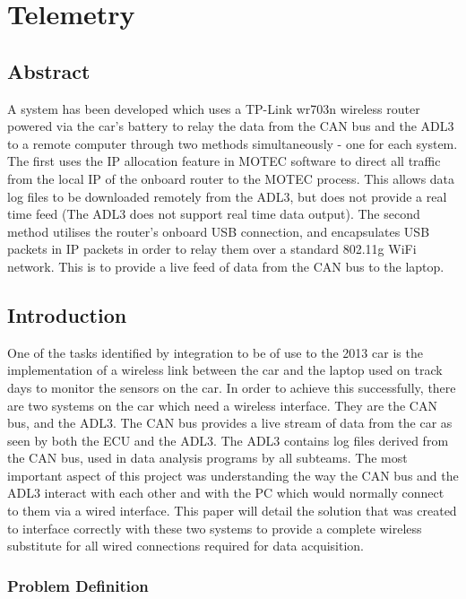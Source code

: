 

\chapter{Telemetry}
\section{Abstract}
A system has been developed which uses a TP-Link wr703n wireless router powered via the car's battery to relay the data from the CAN bus and the ADL3 to a remote computer through two methods simultaneously - one for each system. The first uses the IP allocation feature in MOTEC software to direct all traffic from the local IP of the onboard router to the MOTEC process. This allows data log files to be downloaded remotely from the ADL3, but does not provide a real time feed (The ADL3 does not support real time data output). The second method utilises the router's onboard USB connection, and encapsulates USB packets in IP packets in order to relay them over a standard 802.11g WiFi network. This is to provide a live feed of data from the CAN bus to the laptop.

\section{Introduction}
One of the tasks identified by integration to be of use to the 2013 car is the implementation of a wireless link between the car and the laptop used on track days to monitor the sensors on the car. In order to achieve this successfully, there are two systems on the car which need a wireless interface. They are the CAN bus, and the ADL3. The CAN bus provides a live stream of data from the car as seen by both the ECU and the ADL3. The ADL3 contains log files derived from the CAN bus, used in data analysis programs by all subteams. The most important aspect of this project was understanding the way the CAN bus and the ADL3 interact with each other and with the PC which would normally connect to them via a wired interface. This paper will detail the solution that was created to interface correctly with these two systems to provide a complete wireless substitute for all wired connections required for data acquisition.

\subsection{Problem Definition}
